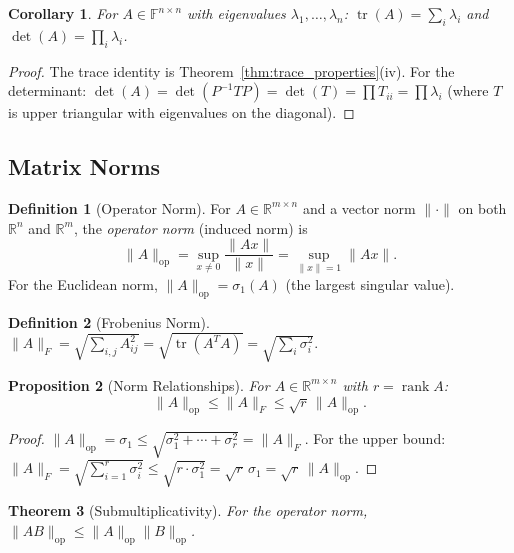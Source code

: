 \documentclass[11pt,a4paper]{article}
\theoremstyle{definition}
\newtheorem{definition}{Definition}[section]
\theoremstyle{plain}
\newtheorem{theorem}{Theorem}[section]
\newtheorem{proposition}[theorem]{Proposition}
\newtheorem{corollary}[theorem]{Corollary}
\theoremstyle{remark}
\newcommand{\R}{\mathbb{R}}
\newcommand{\F}{\mathbb{F}}
\DeclareMathOperator{\rank}{rank}
\DeclareMathOperator{\tr}{tr}
\begin{document}
\begin{corollary}
\label{cor:trace_det_char_poly}
For $A \in \F^{n \times n}$ with eigenvalues $\lambda_1, \ldots, \lambda_n$:
$\tr(A) = \sum_i \lambda_i$ and $\det(A) = \prod_i \lambda_i$.
\end{corollary}

\begin{proof}
The trace identity is Theorem~\ref{thm:trace_properties}(iv). For the determinant:
$\det(A) = \det(P^{-1} T P) = \det(T) = \prod T_{ii} = \prod \lambda_i$ (where $T$ is
upper triangular with eigenvalues on the diagonal).
\end{proof}

\subsection{Matrix Norms}
\label{subsec:matrix_norms}

\begin{definition}[Operator Norm]
\label{def:operator_norm}
For $A \in \R^{m \times n}$ and a vector norm $\|\cdot\|$ on both $\R^n$ and $\R^m$,
the \emph{operator norm} (induced norm) is
\[
    \|A\|_{\text{op}} = \sup_{x \neq 0} \frac{\|Ax\|}{\|x\|} = \sup_{\|x\| = 1} \|Ax\|.
\]
For the Euclidean norm, $\|A\|_{\text{op}} = \sigma_1(A)$ (the largest singular value).
\end{definition}

\begin{definition}[Frobenius Norm]
\label{def:frobenius}
$\|A\|_F = \sqrt{\sum_{i,j} A_{ij}^2} = \sqrt{\tr(A^T A)} = \sqrt{\sum_i \sigma_i^2}$.
\end{definition}

\begin{proposition}[Norm Relationships]
\label{prop:norm_relations}
For $A \in \R^{m \times n}$ with $r = \rank A$:
\[
    \|A\|_{\text{op}} \leq \|A\|_F \leq \sqrt{r}\,\|A\|_{\text{op}}.
\]
\end{proposition}

\begin{proof}
$\|A\|_{\text{op}} = \sigma_1 \leq \sqrt{\sigma_1^2 + \cdots + \sigma_r^2} = \|A\|_F$.
For the upper bound: $\|A\|_F = \sqrt{\sum_{i=1}^r \sigma_i^2} \leq \sqrt{r \cdot \sigma_1^2}
= \sqrt{r}\,\sigma_1 = \sqrt{r}\,\|A\|_{\text{op}}$.
\end{proof}

\begin{theorem}[Submultiplicativity]
\label{thm:submultiplicativity}
For the operator norm, $\|AB\|_{\text{op}} \leq \|A\|_{\text{op}} \|B\|_{\text{op}}$.
\end{theorem}
\end{document}
